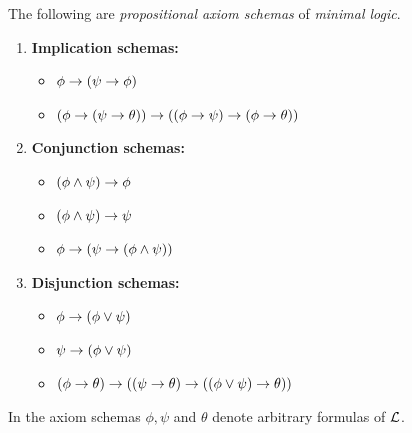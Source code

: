 \documentclass[10pt]{amsart}
\begin{document}
\begin{definition}
	The following are \textit{propositional axiom schemas} of \textit{minimal logic}.
	\begin{enumerate}[label=\textbf{\arabic*.}]
		\item \textbf{Implication schemas:}
		      \begin{itemize}
			      \item[] $\phi \rightarrow \left(\psi \rightarrow \phi\right)$
			      \item[] $\left(\phi \rightarrow \left(\psi \rightarrow \theta\right)\right) \rightarrow \left(\left(\phi \rightarrow \psi\right) \rightarrow \left(\phi \rightarrow \theta\right)\right)$
		      \end{itemize}
		\item \textbf{Conjunction schemas:}
		      \begin{itemize}
			      \item[] $(\phi \wedge \psi) \rightarrow \phi$
			      \item[] $(\phi \wedge \psi) \rightarrow \psi$
			      \item[] $\phi \rightarrow \left(\psi \rightarrow \left(\phi \wedge \psi\right)\right)$
		      \end{itemize}
		\item \textbf{Disjunction schemas:}
		      \begin{itemize}
			      \item[] $\phi \rightarrow (\phi \vee \psi)$
			      \item[] $\psi \rightarrow (\phi \vee \psi)$
			      \item[] $(\phi \rightarrow \theta)\rightarrow \left((\psi \rightarrow \theta) \rightarrow \left((\phi \vee \psi)\rightarrow \theta\right)\right)$
		      \end{itemize}
	\end{enumerate}
	In the axiom schemas $\phi,\psi$ and $\theta$ denote arbitrary formulas of ${\mathcal L}$.
\end{definition}
\end{document}
